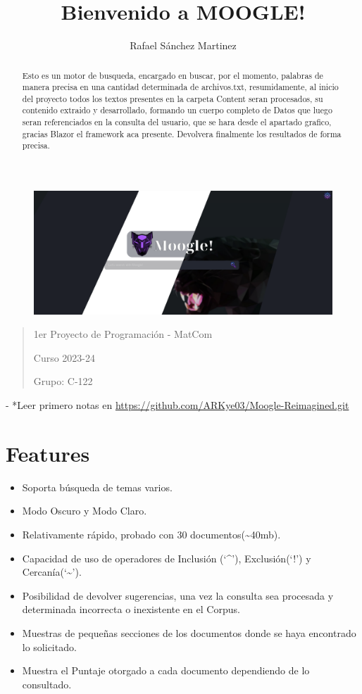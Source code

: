 \documentclass{article}
\begin{document}
\title{Bienvenido a MOOGLE!}
\author{Rafael Sánchez Martinez}
\maketitle

\begin{figure}[h]
    \includegraphics[width=470px]{Assets/moogle.png}
\end{figure}

\begin{quote}
1er Proyecto de Programación - MatCom

Curso 2023-24

Grupo: C-122
\end{quote}

- *Leer primero notas en \url{https://github.com/ARKye03/Moogle-Reimagined.git}

\begin{abstract}
    Esto es un motor de busqueda, encargado en buscar, por el momento, palabras de manera precisa en una cantidad determinada de archivos.txt, resumidamente, al inicio del proyecto todos los textos presentes en la carpeta Content seran procesados, su contenido extraido y desarrollado, formando un cuerpo completo de Datos que luego seran referenciados en la consulta del usuario, que se hara desde el apartado grafico, gracias Blazor el framework aca presente. Devolvera finalmente los resultados de forma precisa.
\end{abstract}

\section*{Features}\label{sec:ent}
\begin{itemize}
    \item
  Soporta búsqueda de temas varios.
    \item
  Modo Oscuro y Modo Claro.
    \item
  Relativamente rápido, probado con 30 documentos(\textasciitilde40mb).
    \item
  Capacidad de uso de operadores de Inclusión (`\^{}'), Exclusión(`!') y
  Cercanía(`\textasciitilde{}').
    \item
  Posibilidad de devolver sugerencias, una vez la consulta sea procesada
  y determinada incorrecta o inexistente en el Corpus.
    \item
  Muestras de pequeñas secciones de los documentos donde se haya
  encontrado lo solicitado.
    \item
  Muestra el Puntaje otorgado a cada documento dependiendo de lo
  consultado.
\end{itemize}
\end{document}
